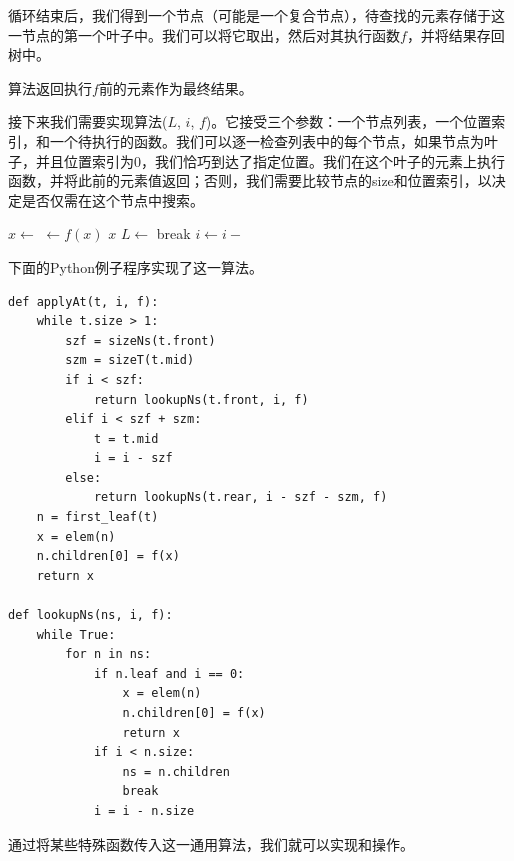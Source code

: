\documentclass[b5paper]{ctexart}
\begin{document}
循环结束后，我们得到一个节点（可能是一个复合节点），待查找的元素存储于这一节点的第一个叶子中。我们可以将它取出，然后对其执行函数$f$，并将结果存回树中。

算法返回执行$f$前的元素作为最终结果。

接下来我们需要实现算法($L$, $i$, $f$)。它接受三个参数：一个节点列表，一个位置索引，和一个待执行的函数。我们可以逐一检查列表中的每个节点，如果节点为叶子，并且位置索引为0，我们恰巧到达了指定位置。我们在这个叶子的元素上执行函数，并将此前的元素值返回；否则，我们需要比较节点的size和位置索引，以决定是否仅需在这个节点中搜索。

\begin{algorithmic}
  \Loop
        \State $x \gets $ 
        \State {} $\gets f(x)$
        \State \Return $x$
      \EndIf
        \State $L \gets $ 
        \State break
      \EndIf
      \State $i \gets i - $ 
    \EndFor
  \EndLoop
\EndFunction
\end{algorithmic}

下面的Python例子程序实现了这一算法。

\lstset{language=Python}
\begin{lstlisting}
def applyAt(t, i, f):
    while t.size > 1:
        szf = sizeNs(t.front)
        szm = sizeT(t.mid)
        if i < szf:
            return lookupNs(t.front, i, f)
        elif i < szf + szm:
            t = t.mid
            i = i - szf
        else:
            return lookupNs(t.rear, i - szf - szm, f)
    n = first_leaf(t)
    x = elem(n)
    n.children[0] = f(x)
    return x

def lookupNs(ns, i, f):
    while True:
        for n in ns:
            if n.leaf and i == 0:
                x = elem(n)
                n.children[0] = f(x)
                return x
            if i < n.size:
                ns = n.children
                break
            i = i - n.size
\end{lstlisting}

通过将某些特殊函数传入这一通用算法，我们就可以实现和操作。

\begin{algorithmic}
  \State \Return {}
\EndFunction
\Statex
{}
  \State \Return {}
\EndFunction
\end{algorithmic}
\end{document}
